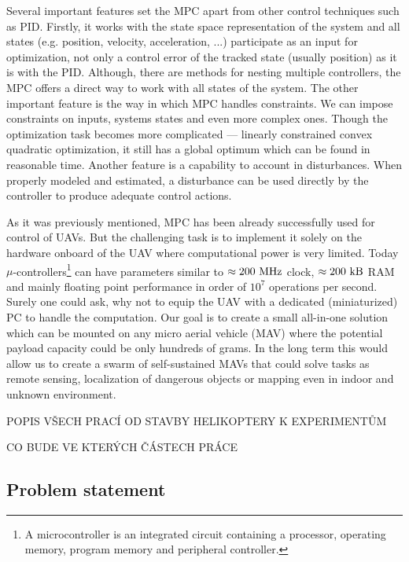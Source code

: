 Several important features set the MPC apart from other control techniques such as PID. Firstly, it works with the state space representation of the system and all states (e.g. position, velocity, acceleration, ...) participate as an input for optimization, not only a control error of the tracked state (usually position) as it is with the PID. Although, there are methods for nesting multiple controllers, the MPC offers a direct way to work with all states of the system. The other important feature is the way in which MPC handles constraints. We can impose constraints on inputs, systems states and even more complex ones. Though the optimization task becomes more complicated --- linearly constrained convex quadratic optimization, it still has a global optimum which can be found in reasonable time. Another feature is a capability to account in disturbances. When properly modeled and estimated, a disturbance can be used directly by the controller to produce adequate control actions.

As it was previously mentioned, MPC has been already successfully used for control of UAVs. But the challenging task is to implement it solely on the hardware onboard of the UAV where computational power is very limited. Today $\mu$-controllers\footnote{A microcontroller is an integrated circuit containing a processor, operating memory, program memory and peripheral controller.} can have parameters similar to $\approx 200 ~\mathrm{MHz}$ clock, $\approx 200 ~\mathrm{kB}$ RAM and mainly floating point performance in order of $10^7$ operations per second. Surely one could ask, why not to equip the UAV with a dedicated (miniaturized) PC to handle the computation. Our goal is to create a small all-in-one solution which can be mounted on any micro aerial vehicle (MAV) where the potential payload capacity could be only hundreds of grams. In the long term this would allow us to create a swarm of self-sustained MAVs that could solve tasks as remote sensing, localization of dangerous objects or mapping even in indoor and unknown environment.

POPIS VŠECH PRACÍ OD STAVBY HELIKOPTERY K EXPERIMENTŮM

CO BUDE VE KTERÝCH ČÁSTECH PRÁCE

\subsection{Problem statement}

